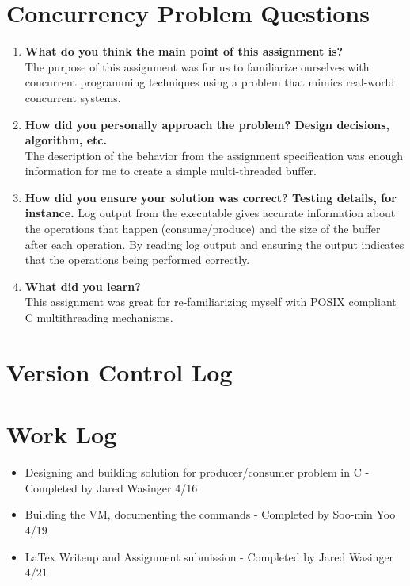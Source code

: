 \documentclass[letterpaper,10pt]{article}
\begin{document}
\section{Concurrency Problem Questions}

\begin{enumerate}
  \item{\textbf{What do you think the main point of this assignment is?}}\\
  The purpose of this assignment was for us to familiarize ourselves with concurrent programming techniques using a problem that mimics real-world concurrent systems.\\
  \item{\textbf{How did you personally approach the problem? Design decisions, algorithm, etc.}}\\
  The description of the behavior from the assignment specification was enough information for me to create a simple multi-threaded buffer.
  \item{\textbf{How did you ensure your solution was correct? Testing details, for instance.}}
  Log output from the executable gives accurate information about the operations that happen (consume/produce) and the size of the buffer after each operation.  By reading log output and ensuring the output indicates that the operations being performed correctly.\\
  \item{\textbf{What did you learn?}}\\
  This assignment was great for re-familiarizing myself with POSIX compliant C multithreading mechanisms.\\
\end{enumerate}
\section{Version Control Log}


\section{Work Log}
\begin{itemize}
  \item{Designing and building solution for producer/consumer problem in C - Completed by Jared Wasinger 4/16}
  \item{Building the VM, documenting the commands - Completed by Soo-min Yoo 4/19}
  \item{LaTex Writeup and Assignment submission - Completed by Jared Wasinger 4/21}
\end{itemize}
\end{document}

